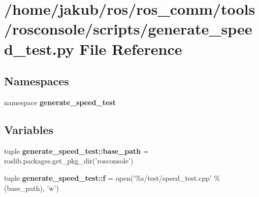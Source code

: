 \section{/home/jakub/ros/ros\_\-comm/tools/rosconsole/scripts/generate\_\-speed\_\-test.py File Reference}
\label{generate__speed__test_8py}
\subsection*{Namespaces}
\begin{DoxyCompactItemize}
\item 
namespace {\bf generate\_\-speed\_\-test}
\end{DoxyCompactItemize}
\subsection*{Variables}
\begin{DoxyCompactItemize}
\item 
tuple {\bf generate\_\-speed\_\-test::base\_\-path} = roslib.packages.get\_\-pkg\_\-dir('rosconsole')
\item 
tuple {\bf generate\_\-speed\_\-test::f} = open('\%s/test/speed\_\-test.cpp' \% (base\_\-path), 'w')
\end{DoxyCompactItemize}
